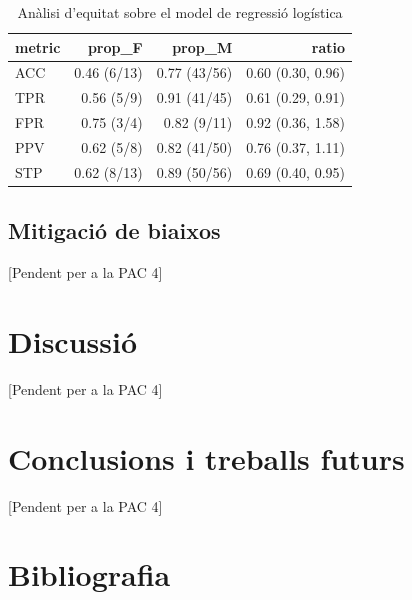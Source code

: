 \documentclass[CAT]{TFUOC}%
\begin{document}
\begin{table}[t]
\caption{\label{tab:table-fair-glm}Anàlisi d'equitat sobre el model de regressió logística} 
\fontsize{12.0pt}{14.0pt}\selectfont
\begin{tabular*}{\linewidth}{@{\extracolsep{\fill}}lrrr}
\toprule
metric & prop\_F & prop\_M & ratio \\ 
\midrule\addlinespace[2.5pt]
ACC & 0.46 (6/13) & 0.77 (43/56) & 0.60 (0.30, 0.96) \\ 
TPR & 0.56 (5/9) & 0.91 (41/45) & 0.61 (0.29, 0.91) \\ 
FPR & 0.75 (3/4) & 0.82 (9/11) & 0.92 (0.36, 1.58) \\ 
PPV & 0.62 (5/8) & 0.82 (41/50) & 0.76 (0.37, 1.11) \\ 
STP & 0.62 (8/13) & 0.89 (50/56) & 0.69 (0.40, 0.95) \\ 
\bottomrule
\end{tabular*}
\end{table}

\section{Mitigació de biaixos}\label{mitigaciuxf3-de-biaixos}

{[}Pendent per a la PAC 4{]}

\chapter{Discussió}\label{discussiuxf3}

{[}Pendent per a la PAC 4{]}

\chapter{Conclusions i treballs futurs}\label{conclusions-i-treballs-futurs}

{[}Pendent per a la PAC 4{]}

\chapter{Bibliografia}\label{bibliografia}
\end{document}
